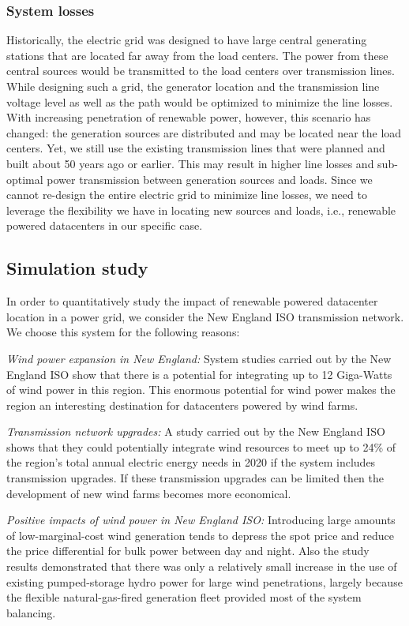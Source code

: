 \subsubsection{System losses}
Historically, the electric grid was designed to have large central generating stations that are located far away from the load centers. The power from these central sources would be transmitted to the load centers over transmission lines. While designing such a grid, the generator location and the transmission line voltage level as well as the path would be optimized to minimize the line losses.  With increasing penetration of renewable power, however, this scenario has changed: the generation sources are distributed and may be located near the load centers.  Yet, we still use the existing transmission lines that were planned and built about 50 years ago or earlier.  This may result in higher line losses and sub-optimal power transmission between generation sources and loads. Since we cannot re-design the entire electric grid to minimize line losses, we need to leverage the flexibility we have in locating new sources and loads, i.e., renewable powered datacenters in our specific case.


\subsection{Simulation study}
In order to quantitatively study the impact of renewable powered datacenter location in a power grid, we consider the New England ISO transmission network. We choose this system for the following reasons:

{\em Wind power expansion in New England:} System studies carried out by the New England ISO show that there is a potential for integrating up to 12 Giga-Watts of wind power in this region.  This enormous potential for wind power makes the region an interesting destination for datacenters powered by wind farms.

{\em Transmission network upgrades:} A study carried out by the New England ISO shows that they could potentially integrate wind resources to meet up to 24\% of the region's total annual electric energy needs in 2020 if the system includes transmission
upgrades. If these transmission upgrades can be limited then the development of new wind farms becomes more economical.

{\em Positive impacts of wind power in New England ISO:} Introducing large amounts of low-marginal-cost wind generation tends to depress the spot price and reduce the price differential for bulk power between day and night. Also the study results demonstrated that there was only a relatively small increase in the use of existing pumped-storage hydro power for large wind penetrations, largely because the flexible natural-gas-fired generation fleet provided most of the system balancing.

